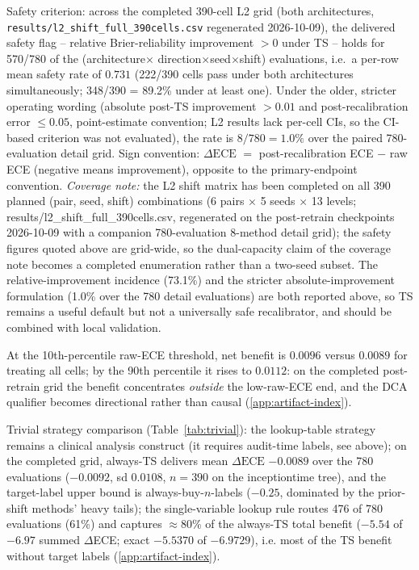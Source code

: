 \documentclass[review,12pt,nonatbib]{elsarticle}
\begin{document}
Safety criterion: across the completed 390-cell L2 grid (both
architectures, \texttt{results/l2\_shift\_full\_390cells.csv} regenerated
2026-10-09), the delivered safety flag -- relative Brier-reliability
improvement $>0$ under TS -- holds for 570/780 of the (architecture$\times$
direction$\times$seed$\times$shift) evaluations, i.e.\ a per-row mean safety
rate of $0.731$ (222/390 cells pass under both architectures
simultaneously; 348/390 = 89.2\% under at least one). Under the older,
stricter operating wording (absolute post-TS improvement $>0.01$ and
post-recalibration error $\leq 0.05$, point-estimate convention; L2
results lack per-cell CIs, so the CI-based criterion was not evaluated),
the rate is $8/780 = 1.0\%$ over the paired 780-evaluation detail grid.
Sign convention:
$\Delta\text{ECE}$ $=$ post-recalibration ECE $-$ raw ECE (negative means
improvement), opposite to the primary-endpoint convention.
\emph{Coverage note:} the L2 shift matrix has been completed on all 390
planned (pair, seed, shift) combinations (6 pairs $\times$ 5 seeds
$\times$ 13 levels; results/l2\_shift\_full\_390cells.csv, regenerated on
the post-retrain checkpoints 2026-10-09 with a companion 780-evaluation
8-method detail grid); the safety figures quoted above are grid-wide, so
the dual-capacity claim of the coverage note becomes a completed
enumeration rather than a two-seed subset. The relative-improvement
incidence (73.1\%) and the stricter absolute-improvement formulation
(1.0\% over the 780 detail evaluations) are both reported above, so TS
remains a useful default but not a universally safe recalibrator, and
should be combined with local validation.

At the 10th-percentile raw-ECE
threshold, net benefit is $0.0096$ versus $0.0089$ for treating all cells;
by the 90th percentile it rises to $0.0112$: on the completed post-retrain
grid the benefit concentrates \emph{outside} the low-raw-ECE end, and the
DCA qualifier becomes directional rather than causal
(\ref{app:artifact-index}).

Trivial strategy comparison (Table~\ref{tab:trivial}): the
lookup-table strategy remains a clinical analysis construct (it requires
audit-time labels, see above); on the completed grid, always-TS delivers
mean $\Delta\text{ECE}$ $-0.0089$ over the 780 evaluations ($-0.0092$,
sd $0.0108$, $n=390$ on the inceptiontime tree), and the
target-label upper bound is always-buy-$n$-labels ($-0.25$, dominated by
the prior-shift methods' heavy tails); the single-variable lookup rule
routes 476 of 780 evaluations (61\%) and captures $\approx$80\% of the
always-TS total benefit ($-5.54$ of $-6.97$ summed $\Delta$ECE; exact
$-5.5370$ of $-6.9729$), i.e.
most of the TS benefit without target labels
(\ref{app:artifact-index}).
\end{document}
